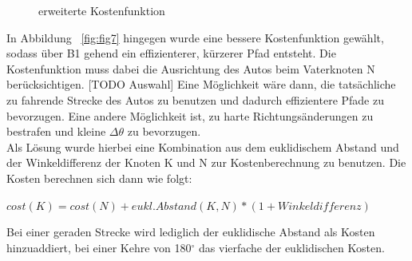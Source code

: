\begin{figure}[htb]
\begin{minipage}[t]{0.45\linewidth}
        \caption{erweiterte Kostenfunktion}
    \end{minipage}
\end{figure}


In Abbildung ~\ref{fig:fig7} hingegen wurde eine bessere Kostenfunktion gewählt, sodass über B1 gehend ein effizienterer, kürzerer Pfad entsteht. Die Kostenfunktion muss dabei die Ausrichtung des Autos beim Vaterknoten N berücksichtigen. [TODO Auswahl] Eine Möglichkeit wäre dann, die tatsächliche zu fahrende Strecke des Autos zu benutzen und dadurch effizientere Pfade zu bevorzugen. Eine andere Möglichkeit ist, zu harte Richtungsänderungen zu bestrafen und kleine $ \Delta \theta$ zu bevorzugen. \\
Als Lösung wurde hierbei eine Kombination aus dem euklidischem Abstand und der Winkeldifferenz der Knoten K und N zur Kostenberechnung zu benutzen. Die Kosten berechnen sich dann wie folgt: 
\begin{center}
$cost(K) = cost(N) +eukl. Abstand(K,N) * (1+Winkeldifferenz)$
\end{center} 
Bei einer geraden Strecke wird lediglich der euklidische Abstand als Kosten hinzuaddiert, bei einer Kehre von 180$^{\circ}$ das vierfache der euklidischen Kosten.  
